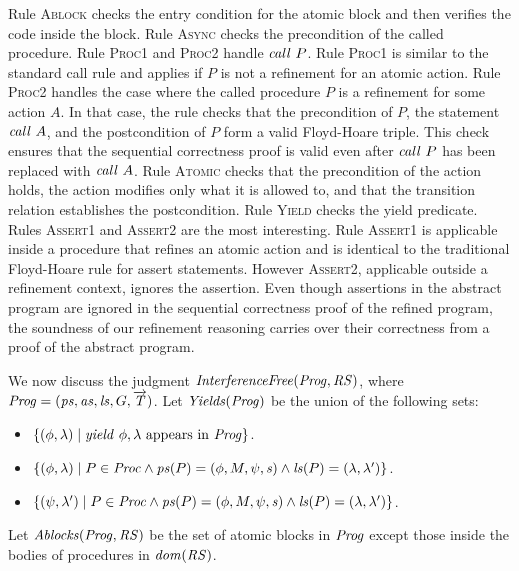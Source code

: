 Rule \textsc{Ablock} checks the entry condition for the atomic block and then verifies 
the code inside the block.
Rule \textsc{Async} checks the precondition of the called procedure.
Rule \textsc{Proc1} and \textsc{Proc2} handle $\mathit{call}\ P$.  
Rule \textsc{Proc1} is similar to the standard call rule and applies if $P$ is not a refinement for an atomic action.
Rule \textsc{Proc2} handles the case where the called procedure $P$ is a refinement for some action $A$.
In that case, the rule checks that the precondition of $P$, the statement $\mathit{call}\ A$, and the postcondition of $P$
form a valid Floyd-Hoare triple.
This check ensures that the sequential correctness proof is valid even after $\mathit{call}\ P$ has been replaced with $\mathit{call}\ A$.
Rule \textsc{Atomic} checks that the precondition of the action holds, the action modifies only what it is allowed to,
and that the transition relation establishes the postcondition.
Rule \textsc{Yield} checks the yield predicate.
Rules \textsc{Assert1} and \textsc{Assert2} are the most interesting.
Rule \textsc{Assert1} is applicable inside a procedure that refines an atomic action 
and is identical to the traditional Floyd-Hoare rule for assert statements.
However \textsc{Assert2}, applicable outside a refinement context, ignores the assertion.
Even though assertions in the abstract program are ignored in the sequential correctness proof of the refined program,
the soundness of our refinement reasoning carries over their correctness from a proof of the abstract program.

We now discuss the judgment $\mathit{InterferenceFree}(\mathit{Prog},\mathit{RS})$,
where $\mathit{Prog} = (\mathit{ps}, \mathit{as}, \mathit{ls}, G, \overrightarrow{\mathit{T}})$. 
Let $\mathit{Yields}(\mathit{Prog})$ be the union of the following sets:
\begin{itemize}
\item
$\{(\phi,\lambda) \mid \mathit{yield}\ \phi,\lambda~\mathrm{appears~in~\mathit{Prog}}\}$.
\item
$\{(\phi,\lambda) \mid P \in \mathit{Proc} \wedge \mathit{ps}(P) = (\phi, M, \psi, \mathit{s}) \wedge \mathit{ls}(P) = (\lambda,\lambda')\}$.
\item
$\{(\psi,\lambda') \mid P \in \mathit{Proc} \wedge \mathit{ps}(P) = (\phi, M, \psi, \mathit{s}) \wedge \mathit{ls}(P) = (\lambda,\lambda')\}$.
\end{itemize}
Let $\mathit{Ablocks}(\mathit{Prog},\mathit{RS})$ be the set of atomic blocks in $\mathit{Prog}$ except those inside the bodies of procedures
in $\mathit{dom}(\mathit{RS})$.

